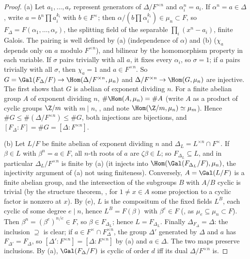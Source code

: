 \begin{proof}
(a) Let $a_1,\dots,a_r$ represent generators of $\Delta/F^{\times n}$ and $\alpha_i^n=a_i$. If $\alpha^n=a\in\Delta$, write $a=b^n\prod a_i^{k_i}$ with $b\in F^\times$; then
$\alpha/(b\prod\alpha_i^{k_i})\in\mu_n\subset F$, so $F_\Delta=F(\alpha_1,\dots,\alpha_r)$, the splitting field of the separable $\prod_i(x^n-a_i)$, finite Galois. The
pairing is well defined by (a) (independence of $\alpha$) and (b) ($\chi_a$ depends only on $a$ modulo $F^{\times n}$), and
bilinear by the homomorphism property in each variable. If $\sigma$ pairs trivially with all $a$, it fixes every $\alpha_i$, so $\sigma=1$; if $a$ pairs trivially
with all $\sigma$, then $\chi_a=1$ and $a\in F^{\times n}$. So $G=\Gal(F_\Delta/F)\to\Hom(\Delta/F^{\times n},\mu_n)$ and $\Delta/F^{\times n}\to\Hom(G,\mu_n)$ are
injective. The first shows that $G$ is abelian of exponent dividing $n$. For a finite abelian group $A$ of exponent dividing $n$, $\#\Hom(A,\mu_n)=\#A$ (write $A$ as
a product of cyclic groups $\Z/m$ with $m\mid n$, , and note $\Hom(\Z/m,\mu_n)\simeq\mu_m$). Hence $\#G\le\#(\Delta/F^{\times n})\le\#G$, both injections
are bijections, and $[F_\Delta:F]=\#G=[\Delta:F^{\times n}]$.

(b) Let $L/F$ be finite abelian of exponent dividing $n$ and $\Delta_L=L^{\times n}\cap F^\times$. If $\beta\in L$ with $\beta^n=a\in F$, all $n$-th roots of $a$ are
$\zeta\beta\in L$; so $F_{\Delta_L}\subseteq L$, and in particular $\Delta_L/F^{\times n}$ is finite by (a) (it injects into $\Hom(\Gal(F_{\Delta_L}/F),\mu_n)$, the
injectivity argument of (a) not using finiteness). Conversely, $A=\Gal(L/F)$ is a finite abelian group, and the intersection of the subgroups $B$ with $A/B$ cyclic
is trivial (by the structure theorem, , for $1\ne x\in A$ some projection to a cyclic factor is nonzero at $x$). By
(e), $L$ is the compositum of the fixed fields $L^B$, each cyclic of some degree $e\mid n$, hence $L^B=F(\beta)$ with $\beta^e\in F$
(, as $\mu_e\subseteq\mu_n\subset F$). Then $\beta^n=(\beta^e)^{n/e}\in F$, so $\beta\in F_{\Delta_L}$; hence $L=F_{\Delta_L}$. Finally
$\Delta_{F_\Delta}=\Delta$: the inclusion $\supseteq$ is clear; if $a\in F^\times\cap F_\Delta^{\times n}$, the group $\Delta'$ generated by $\Delta$ and $a$ has
$F_{\Delta'}=F_\Delta$, so $[\Delta':F^{\times n}]=[\Delta:F^{\times n}]$ by (a) and $a\in\Delta$. The two maps preserve inclusions. By (a), $\Gal(F_\Delta/F)$ is cyclic
of order $d$ iff its dual $\Delta/F^{\times n}$ is.
\end{proof}


